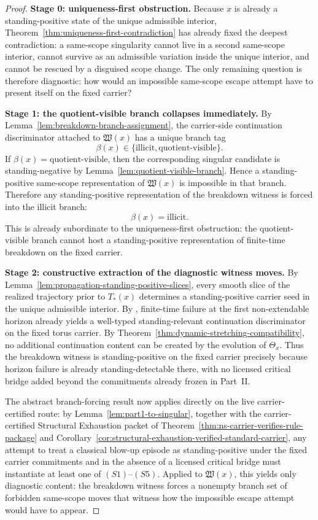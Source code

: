 \begin{proof}
\textbf{Stage 0: uniqueness-first obstruction.}
Because $x$ is already a standing-positive state of the unique admissible interior, Theorem~\ref{thm:uniqueness-first-contradiction} has already fixed the deepest contradiction: a same-scope singularity cannot live in a second same-scope interior, cannot survive as an admissible variation inside the unique interior, and cannot be rescued by a disguised scope change. The only remaining question is therefore diagnostic: how would an impossible same-scope escape attempt have to present itself on the fixed carrier?

\textbf{Stage 1: the quotient-visible branch collapses immediately.}
By Lemma~\ref{lem:breakdown-branch-assignment}, the carrier-side continuation discriminator attached to
$\mathfrak W(x)$ has a unique branch tag
\[
\beta(x)\in\{\mathrm{illicit},\mathrm{quotient\mbox{-}visible}\}.
\]
If $\beta(x)=\mathrm{quotient\mbox{-}visible}$, then the corresponding singular candidate is standing-negative by
Lemma~\ref{lem:quotient-visible-branch}. Hence a standing-positive same-scope representation of
$\mathfrak W(x)$ is impossible in that branch. Therefore any standing-positive representation of the
breakdown witness is forced into the illicit branch:
\[
\beta(x)=\mathrm{illicit}.
\]
This is already subordinate to the uniqueness-first obstruction: the quotient-visible branch cannot host a standing-positive representation of finite-time breakdown on the fixed carrier.

\textbf{Stage 2: constructive extraction of the diagnostic witness moves.}
By Lemma~\ref{lem:propagation-standing-positive-slices}, every smooth slice of the realized trajectory
prior to $T_*(x)$ determines a standing-positive carrier seed in the unique admissible interior. By
\HorizonDetectabilityRef{}, finite-time failure at the first non-extendable horizon already yields a
well-typed standing-relevant continuation discriminator on the fixed torus carrier. By
Theorem~\ref{thm:dynamic-stretching-compatibility}, no additional continuation content can be created
by the evolution of $\Theta_x$. Thus the breakdown witness is standing-positive on the fixed carrier
precisely because horizon failure is already standing-detectable there, with no licensed critical
bridge added beyond the commitments already frozen in Part~II.

The abstract branch-forcing result now applies directly on the live carrier-certified route: by
Lemma~\ref{lem:part1-to-singular}, together with the carrier-certified Structural Exhaustion packet of
Theorem~\ref{thm:ns-carrier-verifies-rule-package} and
Corollary~\ref{cor:structural-exhaustion-verified-standard-carrier}, any attempt to treat a classical
blow-up episode as standing-positive under the fixed carrier commitments and in the absence of a
licensed critical bridge must instantiate at least one of $(S1)$--$(S5)$. Applied to $\mathfrak W(x)$,
this yields only diagnostic content: the breakdown witness forces a nonempty branch set of forbidden
same-scope moves that witness how the impossible escape attempt would have to appear.


\end{proof}
